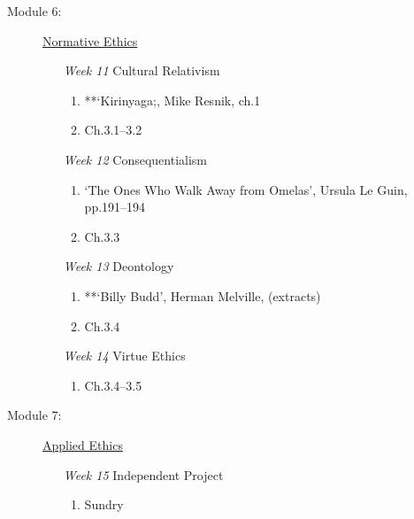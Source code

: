 \documentclass[article,oneside]{memoir}
\begin{document}
\begin{description}
\item[Module 6:] \href{http://scoconno.github.io/Teaching/Examined/Ethics/}{Normative Ethics}
\begin{enumerate}

\item[\textit{Week 11}] Cultural Relativism
\begin{enumerate}
\item **`Kirinyaga;, Mike Resnik, ch.1
\item Ch.3.1--3.2
\end{enumerate}
\item[\textit{Week 12}]  Consequentialism 
\begin{enumerate}
\item  `The Ones Who Walk Away from Omelas', Ursula Le Guin, pp.191--194 
\item Ch.3.3
\end{enumerate}
\item[\textit{Week 13}]  Deontology
\begin{enumerate}
\item **`Billy Budd', Herman Melville, (extracts)
\item Ch.3.4

\end{enumerate}

\item[\textit{Week 14}] Virtue Ethics
\begin{enumerate}
\item Ch.3.4--3.5
\end{enumerate}
\end{enumerate}

\item[Module 7:] \href{http://scoconno.github.io/Teaching/Examined/Applied/}{Applied Ethics}
\begin{enumerate}

\item[\textit{Week 15}] Independent Project
\begin{enumerate}
\item Sundry
\end{enumerate}
\end{enumerate}

\end{description}
\end{document}
